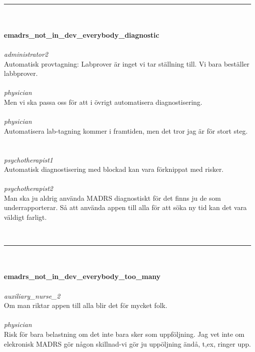 \documentclass[12pt,a4paper,oneside]{article}
\begin{document}
\ \vspace{.66em}\\
\hrule
\ \vspace{.33em}\\
\ \\{\bf emadrs\_not\_in\_dev\_everybody\_diagnostic }
\\\ \\%
 { \it administrator2 %
}\\ 
Automatisk provtagning: Labprover {\"a}r inget vi tar st{\"a}llning till. Vi bara best{\"a}ller labbprover. %
\ \\\ \\
 { \it   physician %
}\\ 
Men vi ska passa oss f{\"o}r att i {\"o}vrigt automatisera diagnostisering.  %
\ \\\ \\
 { \it   physician %
}\\ 
Automatisera lab-tagning kommer i framtiden, men det tror jag {\"a}r f{\"o}r stort steg. %
\ \\\ \\
 { \it   psychotherapist1 %
}\\ 
Automatisk diagnostisering med blockad kan vara f{\"o}rknippat med risker. %
\ \\\ \\
 { \it   psychotherapist2 %
}\\ 
Man ska ju aldrig anv{\"a}nda MADRS diagnostiskt f{\"o}r det finns ju de som underrapporterar. S{\aa} att anv{\"a}nda appen till alla f{\"o}r att s{\"o}ka ny tid kan det vara v{\"a}ldigt farligt. %


\ \vspace{.66em}\\
\hrule
\ \vspace{.33em}\\
\ \\{\bf emadrs\_not\_in\_dev\_everybody\_too\_many }
\\\ \\%
 { \it auxiliary\_nurse\_2 %
}\\ 
Om man riktar appen till alla blir det f{\"o}r mycket folk. %
\ \\\ \\
 { \it   physician %
}\\ 
Risk f{\"o}r bara belastning om det inte bara sker som uppf{\"o}ljning. Jag vet inte om elekronisk MADRS g{\"o}r n{\aa}gon skillnad-vi g{\"o}r ju upp{\"o}ljning {\"a}nd{\aa}, t,ex, ringer upp. %
\end{document}
